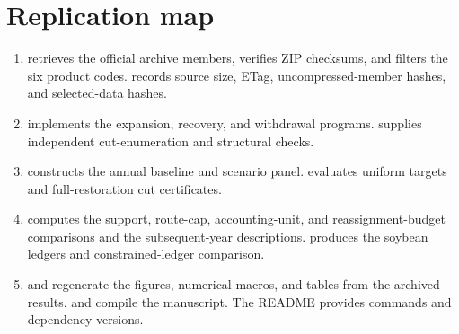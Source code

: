 \documentclass[11pt,a4paper]{article}
\begin{document}
\section{Replication map}
\begin{enumerate}[leftmargin=*,itemsep=3pt]
\item {} retrieves the official archive members, verifies ZIP checksums, and filters the six product codes.  records source size, ETag, uncompressed-member hashes, and selected-data hashes.
\item {} implements the expansion, recovery, and withdrawal programs.  supplies independent cut-enumeration and structural checks.
\item {} constructs the annual baseline and scenario panel.  evaluates uniform targets and full-restoration cut certificates.
\item {} computes the support, route-cap, accounting-unit, and reassignment-budget comparisons and the subsequent-year descriptions.  produces the soybean ledgers and constrained-ledger comparison.
\item {} and  regenerate the figures, numerical macros, and tables from the archived results.  and  compile the manuscript. The README provides commands and dependency versions.
\end{enumerate}
\end{document}
